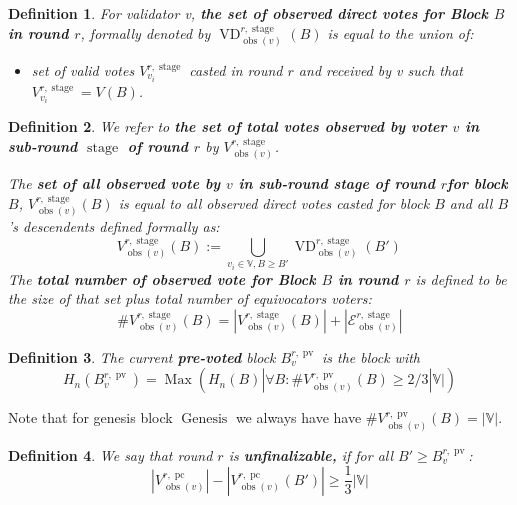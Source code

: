 \documentclass{article}
\newcommand{\assign}{:=}
\newcommand{\nosymbol}{}
\newcommand{\tmop}[1]{\ensuremath{\operatorname{#1}}}
\newcommand{\tmstrong}[1]{\textbf{#1}}
\newcommand{\tmtextbf}[1]{{\bfseries{#1}}}
\newenvironment{itemizedot}{\begin{itemize} \renewcommand{\labelitemi}{$\bullet$}\renewcommand{\labelitemii}{$\bullet$}\renewcommand{\labelitemiii}{$\bullet$}\renewcommand{\labelitemiv}{$\bullet$}}{\end{itemize}}
\newtheorem{definition}{Definition}
\providecommand{\nosymbol}{}
\providecommand{\tmop}[1]{\ensuremath{\mathrm{#1}}}
\providecommand{\tmstrong}[1]{\tmtextbf{#1}}
\providecommand{\tmtextbf}[1]{\tmtextbf{#1}}
\newtheorem{definition}{Definition}
\begin{document}
\begin{definition}
  For validator v, {\tmstrong{the set of observed direct votes for Block $B$
  in round $r$}}, formally denoted by $\tmop{VD}^{r, \tmop{stage}}_{\tmop{obs}
  (v)}^{\nosymbol}_{\nosymbol} (B)$ is equal to the union of:
  \begin{itemizedot}
    \item set of valid votes $V^{r, \tmop{stage}}_{v_i}$ casted in round $r$
    and received by v such that $V^{r, \tmop{stage}}_{v_i} = V (B)$.
  \end{itemizedot}
\end{definition}

\begin{definition}
  We refer to {\tmstrong{the set of total votes observed by voter $v$ in
  sub-round $\tmop{stage}$ of round $r$}} by {\tmstrong{$V^{r,
  \tmop{stage}}_{\tmop{obs} (v)}^{\nosymbol}_{\nosymbol}$}}.
  
  The {\tmstrong{set of all observed vote by $v$ in sub-round stage of round
  $r$for block $B$}}, {\tmstrong{$V^{r, \tmop{stage}}_{\tmop{obs} (v)} (B)$}}
  is equal to all observed direct votes casted for block $B$ and all $B$'s
  descendents defined formally as:
  \[ V^{r, \tmop{stage}}_{\tmop{obs} (v)} (B) \assign \bigcup_{v_i \in
     \mathbb{V}, B \geqslant B'} \tmop{VD}^{r, \tmop{stage}}_{\tmop{obs} (v)}
     (B')_{\nosymbol}^{\nosymbol}_{\nosymbol} \]
  The {\tmstrong{total number of observed vote for Block $B$ in round $r$}} is
  defined to be the size of that set plus total number of equivocators voters:
  \[ \#V^{r, \tmop{stage}}_{\tmop{obs} (v)} (B) = |V^{r,
     \tmop{stage}}_{\tmop{obs} (v)} (B) | + | \mathcal{E}^{r,
     \tmop{stage}}_{\tmop{obs} (v)} | \]
\end{definition}

\begin{definition}
  The current {\tmstrong{pre-voted}} block $B^{r, \tmop{pv}}_v$ is the block
  with
  \[ H_n (B^{r, \tmop{pv}}_v) = \tmop{Max} (H_n (B) | \forall B :
     \#V_{\tmop{obs} (v)}^{r, \tmop{pv}} (B) \geqslant 2 / 3|\mathbb{V}|) \]
\end{definition}

Note that for genesis block $\tmop{Genesis}$ we always have have
$\#V_{\tmop{obs} (v)}^{r, \tmop{pv}} (B) = | \mathbb{V} |$.

\begin{definition}
  We say that round $r$ is {\tmstrong{unfinalizable,}} if for all $B'
  \geqslant B_v^{r, \tmop{pv}}$:
  \[ |V^{r, \tmop{pc}}_{\tmop{obs} (v)} | - |V^{r, \tmop{pc}}_{\tmop{obs}
     (v)_{\nosymbol}} (B') | \geqslant \frac{1}{3} |\mathbb{V}| \]
\end{definition}
\end{document}
